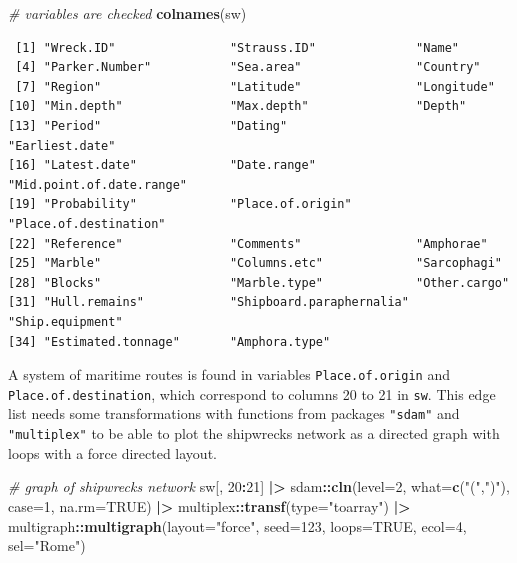 \documentclass[a4paper,11pt]{memoir}
\newenvironment{Shaded}{\begin{snugshade}}{\end{snugshade}}
\newcommand{\CommentTok}[1]{\textcolor[rgb]{0.56,0.35,0.01}{\textit{#1}}}
\newcommand{\DataTypeTok}[1]{\textcolor[rgb]{0.13,0.29,0.53}{#1}}
\newcommand{\DecValTok}[1]{\textcolor[rgb]{0.00,0.00,0.81}{#1}}
\newcommand{\ErrorTok}[1]{\textcolor[rgb]{0.64,0.00,0.00}{\textbf{#1}}}
\newcommand{\KeywordTok}[1]{\textcolor[rgb]{0.13,0.29,0.53}{\textbf{#1}}}
\newcommand{\NormalTok}[1]{#1}
\newcommand{\OperatorTok}[1]{\textcolor[rgb]{0.81,0.36,0.00}{\textbf{#1}}}
\newcommand{\OtherTok}[1]{\textcolor[rgb]{0.56,0.35,0.01}{#1}}
\newcommand{\StringTok}[1]{\textcolor[rgb]{0.31,0.60,0.02}{#1}}
\begin{document}
\begin{Shaded}
\begin{Highlighting}[]
\CommentTok{# variables are checked}
\KeywordTok{colnames}\NormalTok{(sw)}
\end{Highlighting}
\end{Shaded}

\begin{verbatim}
 [1] "Wreck.ID"                "Strauss.ID"              "Name"                   
 [4] "Parker.Number"           "Sea.area"                "Country"                
 [7] "Region"                  "Latitude"                "Longitude"              
[10] "Min.depth"               "Max.depth"               "Depth"                  
[13] "Period"                  "Dating"                  "Earliest.date"          
[16] "Latest.date"             "Date.range"              "Mid.point.of.date.range"
[19] "Probability"             "Place.of.origin"         "Place.of.destination"   
[22] "Reference"               "Comments"                "Amphorae"               
[25] "Marble"                  "Columns.etc"             "Sarcophagi"             
[28] "Blocks"                  "Marble.type"             "Other.cargo"            
[31] "Hull.remains"            "Shipboard.paraphernalia" "Ship.equipment"         
[34] "Estimated.tonnage"       "Amphora.type"           
\end{verbatim}

A system of maritime routes is found in variables
\texttt{Place.of.origin} and \texttt{Place.of.destination}, which
correspond to columns 20 to 21 in \texttt{sw}. This edge list needs some
transformations with functions from packages \texttt{"sdam"} and
\texttt{"multiplex"} to be able to plot the shipwrecks network as a
directed graph with loops with a force directed layout.

\begin{Shaded}
\begin{Highlighting}[]
\CommentTok{# graph of shipwrecks network}
\NormalTok{sw[, }\DecValTok{20}\OperatorTok{:}\DecValTok{21}\NormalTok{] }\OperatorTok{|}\ErrorTok{>}\StringTok{ }
\StringTok{  }\NormalTok{sdam}\OperatorTok{::}\KeywordTok{cln}\NormalTok{(}\DataTypeTok{level=}\DecValTok{2}\NormalTok{, }\DataTypeTok{what=}\KeywordTok{c}\NormalTok{(}\StringTok{"("}\NormalTok{,}\StringTok{")"}\NormalTok{), }\DataTypeTok{case=}\DecValTok{1}\NormalTok{, }\DataTypeTok{na.rm=}\OtherTok{TRUE}\NormalTok{) }\OperatorTok{|}\ErrorTok{>}\StringTok{ }
\StringTok{  }\NormalTok{multiplex}\OperatorTok{::}\KeywordTok{transf}\NormalTok{(}\DataTypeTok{type=}\StringTok{"toarray"}\NormalTok{) }\OperatorTok{|}\ErrorTok{>}\StringTok{ }
\StringTok{  }\NormalTok{multigraph}\OperatorTok{::}\KeywordTok{multigraph}\NormalTok{(}\DataTypeTok{layout=}\StringTok{"force"}\NormalTok{, }\DataTypeTok{seed=}\DecValTok{123}\NormalTok{, }\DataTypeTok{loops=}\OtherTok{TRUE}\NormalTok{, }\DataTypeTok{ecol=}\DecValTok{4}\NormalTok{, }\DataTypeTok{sel=}\StringTok{"Rome"}\NormalTok{)}
\end{Highlighting}
\end{Shaded}
\end{document}
